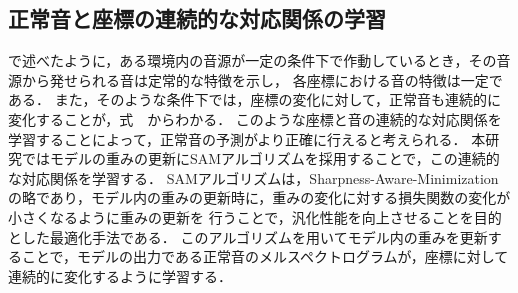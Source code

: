 \documentclass[../main]{subfiles}
\begin{document}
\subsection{正常音と座標の連続的な対応関係の学習}
で述べたように，ある環境内の音源が一定の条件下で作動しているとき，その音源から発せられる音は定常的な特徴を示し，
各座標における音の特徴は一定である．
また，そのような条件下では，座標の変化に対して，正常音も連続的に変化することが，式　からわかる．
このような座標と音の連続的な対応関係を学習することによって，正常音の予測がより正確に行えると考えられる．
本研究ではモデルの重みの更新にSAMアルゴリズムを採用することで，この連続的な対応関係を学習する．
SAMアルゴリズムは，Sharpness-Aware-Minimizationの略であり，モデル内の重みの更新時に，重みの変化に対する損失関数の変化が小さくなるように重みの更新を
行うことで，汎化性能を向上させることを目的とした最適化手法である．
このアルゴリズムを用いてモデル内の重みを更新することで，モデルの出力である正常音のメルスペクトログラムが，座標に対して連続的に変化するように学習する．
\end{document}
